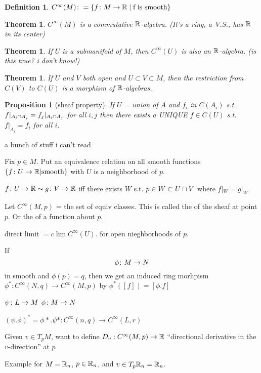 \documentclass[11pt]{amsbook}
\newenvironment{dateenv}{
	\vspace{1em}
}{
	\vspace{1em}
}
\newcommand{\mydate}[4]{
	\newdate{#1}{#2}{#3}{#4}
	\begin{dateenv}
		\hfill\displaydate{#1}
	\end{dateenv}
}
\theoremstyle{mystyle} %
\newtheorem{thrm}[thm]{Theorem}
\newtheorem{defi}[thm]{Definition}
\newtheorem{propo}[thm]{Proposition}
\numberwithin{thm}{section}
\begin{document}
\mydate{d4}{5}{10}{2016}

\begin{defi}
	$C^\infty(M) \colon = \{ f \colon M \to {\mathbb R} \mid \text{f is smooth} \}$
\end{defi}
\begin{thrm}
	$C^\infty(M)$ is a commutative ${\mathbb R}$-algebra. (It's a ring, a V.S., has ${\mathbb R}$ in its center)
\end{thrm}
\begin{thrm}
	If $U$ is a submanifold of $M$, then $C^\infty(U)$ is also an ${\mathbb R}$-algebra.
	(is this true?  i don't know!)
\end{thrm}
\begin{thrm}
	If $U$ and $V$ both open and $U \subset V \subset M$, then
	the restriction from $C(V)$ to $C(U)$ is a morphism of ${\mathbb R}$-algebras.
\end{thrm}
\begin{propo}[sheaf property]
	If $U$ = union of $A$
	and $f_i$ in $C(A_i)$ s.t. $f|_{A_i \cap A_j} = f_j|_{A_i \cap A_j}$ for all $i, j$
	then there exists a UNIQUE $f \in C(U)$ s.t. $f|_{A_i} = f_i$ for all $i$.
\end{propo}

a bunch of stuff i can't read

Fix $p \in M$.
Put an equivalence relation on all smooth functions $\{ f \colon U \to {\mathbb R} | \text{smooth}\}$
with $U$ is a neighborhood of $p$.

$f\colon U \to {\mathbb R} \sim g\colon V \to {\mathbb R}$
iff
there exists $W$ s.t. $p \in W \subset U \cap V$ where $f|_W = g|_W$.

Let $C^\infty(M,p)$ = the set of equiv classes.  This is called the  of the sheaf at point $p$.  Or the  of a function about $p$.

direct limit
$= c\lim C^\infty(U)$.
for open nieghborhoods of $p$.

If $$\phi\colon M \to N$$ in smooth and $\phi(p) = q$, then we get an induced ring morhpism
$\phi^* : C^\infty(N,q) \to C^\infty(M,p)$ by
$\phi^*([f]) = [\phi.f]$

$\psi \colon L \to M$
$\phi \colon M \to N$

$(\psi.\phi)^* = \phi*.\psi* : C^\infty(n,q) \to C^\infty(L,r)$

Given $v \in T_pM$, want to define
$D_v : C^\infty(M,p) \to {\mathbb R}$
``directional derivative in the $v$-direction'' at $p$

Example for $M = {\mathbb R}_n$, $p \in {\mathbb R}_n$, and $v \in T_p{\mathbb R}_n = {\mathbb R}_n$.
\end{document}
